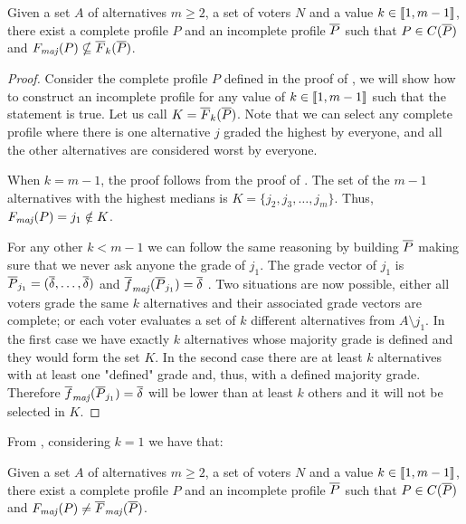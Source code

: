 	\begin{theorem}
		\label{th:uncompleteK}
		Given a set $A$ of alternatives $m\geq 2$, a set of voters $N$ and a value $k\in \llbracket1,m-1\rrbracket$, there exist a complete profile $P$ and an incomplete profile $\overline{P}$ such that $P \in C(\overline{P})$ and $\Fmaj(P) \nsubseteq \overline{F}_k(\Pbar)$.
	\end{theorem}
	\begin{proof}
		Consider the complete profile $P$ defined in the proof of , we will show how to construct an incomplete profile for any value of $k\in \llbracket1,m-1\rrbracket$ such that the statement is true. Let us call $K=\overline{F}_k(\overline{P})$.
		Note that we can select any complete profile where there is one alternative $j$ graded the highest by everyone, and all the other alternatives are considered worst by everyone.
		
		When $k=m-1$, the proof follows from the proof of . The set of the $m-1$ alternatives with the highest medians is $K=\{j_2,j_3,\dots,j_m\}$. Thus, $\Fmaj(P)=j_1 \notin K$.
		
		For any other $k<m-1$ we can follow the same reasoning by building $\overline{P}$ making sure that we never ask anyone the grade of $j_1$. 
		The grade vector of $j_1$ is $\overline{P}_{j_1}=(\overline{\delta}, \dots, \overline{\delta})$ and $\fmajbar(\Pbar_{j_1})=\dbar$ .
		Two situations are now possible, either all voters grade the same $k$ alternatives and their associated grade vectors are complete; or each voter evaluates a set of $k$ different alternatives from $A\setminus j_1$. In the first case we have exactly $k$ alternatives whose majority grade is defined and they would form the set $K$. In the second case there are at least $k$ alternatives with at least one "defined" grade and, thus, with a defined majority grade.  Therefore $\fmajbar(\Pbar_{j_1})=\dbar$ will be lower than at least $k$ others and it will not be selected in $K$.
	\end{proof}	
	
	From , considering $k=1$ we have that:
	\begin{remark}
		Given a set $A$ of alternatives $m\geq 2$, a set of voters $N$ and a value $k\in \llbracket1,m-1\rrbracket$, there exist a complete profile $P$ and an incomplete profile $\overline{P}$ such that $P \in C(\overline{P})$ and $\Fmaj(P) \neq \Fmajbar(\Pbar)$.
	\end{remark}

